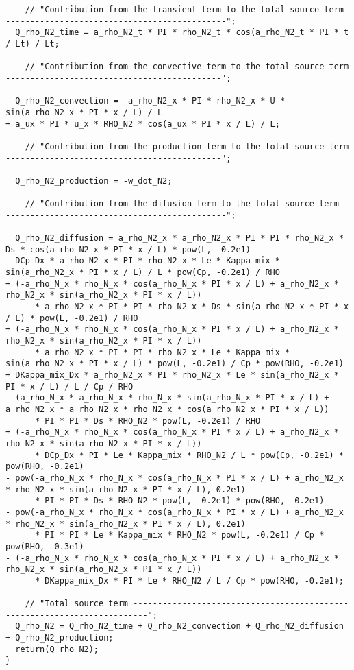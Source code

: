 \documentclass[10pt]{article}
\begin{document}
\begin{scriptsize}
\begin{verbatim}
    // "Contribution from the transient term to the total source term ---------------------------------------------";
  Q_rho_N2_time = a_rho_N2_t * PI * rho_N2_t * cos(a_rho_N2_t * PI * t / Lt) / Lt;

    // "Contribution from the convective term to the total source term --------------------------------------------";

  Q_rho_N2_convection = -a_rho_N2_x * PI * rho_N2_x * U * sin(a_rho_N2_x * PI * x / L) / L 
+ a_ux * PI * u_x * RHO_N2 * cos(a_ux * PI * x / L) / L;

    // "Contribution from the production term to the total source term --------------------------------------------";

  Q_rho_N2_production = -w_dot_N2;

    // "Contribution from the difusion term to the total source term ----------------------------------------------";

  Q_rho_N2_diffusion = a_rho_N2_x * a_rho_N2_x * PI * PI * rho_N2_x * Ds * cos(a_rho_N2_x * PI * x / L) * pow(L, -0.2e1) 
- DCp_Dx * a_rho_N2_x * PI * rho_N2_x * Le * Kappa_mix * sin(a_rho_N2_x * PI * x / L) / L * pow(Cp, -0.2e1) / RHO 
+ (-a_rho_N_x * rho_N_x * cos(a_rho_N_x * PI * x / L) + a_rho_N2_x * rho_N2_x * sin(a_rho_N2_x * PI * x / L)) 
	  * a_rho_N2_x * PI * PI * rho_N2_x * Ds * sin(a_rho_N2_x * PI * x / L) * pow(L, -0.2e1) / RHO 
+ (-a_rho_N_x * rho_N_x * cos(a_rho_N_x * PI * x / L) + a_rho_N2_x * rho_N2_x * sin(a_rho_N2_x * PI * x / L)) 
	  * a_rho_N2_x * PI * PI * rho_N2_x * Le * Kappa_mix * sin(a_rho_N2_x * PI * x / L) * pow(L, -0.2e1) / Cp * pow(RHO, -0.2e1) 
+ DKappa_mix_Dx * a_rho_N2_x * PI * rho_N2_x * Le * sin(a_rho_N2_x * PI * x / L) / L / Cp / RHO 
- (a_rho_N_x * a_rho_N_x * rho_N_x * sin(a_rho_N_x * PI * x / L) + a_rho_N2_x * a_rho_N2_x * rho_N2_x * cos(a_rho_N2_x * PI * x / L)) 
	  * PI * PI * Ds * RHO_N2 * pow(L, -0.2e1) / RHO 
+ (-a_rho_N_x * rho_N_x * cos(a_rho_N_x * PI * x / L) + a_rho_N2_x * rho_N2_x * sin(a_rho_N2_x * PI * x / L)) 
	  * DCp_Dx * PI * Le * Kappa_mix * RHO_N2 / L * pow(Cp, -0.2e1) * pow(RHO, -0.2e1) 
- pow(-a_rho_N_x * rho_N_x * cos(a_rho_N_x * PI * x / L) + a_rho_N2_x * rho_N2_x * sin(a_rho_N2_x * PI * x / L), 0.2e1) 
	  * PI * PI * Ds * RHO_N2 * pow(L, -0.2e1) * pow(RHO, -0.2e1) 
- pow(-a_rho_N_x * rho_N_x * cos(a_rho_N_x * PI * x / L) + a_rho_N2_x * rho_N2_x * sin(a_rho_N2_x * PI * x / L), 0.2e1) 
	  * PI * PI * Le * Kappa_mix * RHO_N2 * pow(L, -0.2e1) / Cp * pow(RHO, -0.3e1) 
- (-a_rho_N_x * rho_N_x * cos(a_rho_N_x * PI * x / L) + a_rho_N2_x * rho_N2_x * sin(a_rho_N2_x * PI * x / L)) 
	  * DKappa_mix_Dx * PI * Le * RHO_N2 / L / Cp * pow(RHO, -0.2e1);

    // "Total source term -------------------------------------------------------------------------";
  Q_rho_N2 = Q_rho_N2_time + Q_rho_N2_convection + Q_rho_N2_diffusion + Q_rho_N2_production;
  return(Q_rho_N2);
}
\end{verbatim}
 \end{scriptsize}
\end{document}
